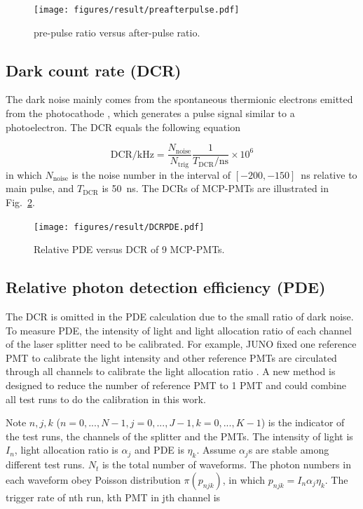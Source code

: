 \begin{figure}[!htbp]
    \centering
    \texttt{[image: figures/result/preafterpulse.pdf]}
    \caption{pre-pulse ratio versus after-pulse ratio.}
    \label{fig:prepulseCompare}
\end{figure}

\subsection{Dark count rate (DCR)}
\label{sec:dcr}
The dark noise mainly comes from the spontaneous thermionic electrons emitted from the photocathode \cite{KM3NetTesting}, which generates a pulse signal similar to a photoelectron. The DCR equals the following equation

\begin{equation}
    \mathrm{DCR/kHz} = \frac{N_{\mathrm{noise}}}{N_{\mathrm{trig}}}\frac{1}{T_{\mathrm{DCR}}/\mathrm{ns}}\times 10^{6}
\end{equation}
in which $N_{\mathrm{noise}}$ is the noise number in the interval of $[-200,-150]$\ ns relative to main pulse, and $T_{\mathrm{DCR}}$ is \SI{50}{ns}. The DCRs of MCP-PMTs are illustrated in Fig.~\ref{fig:DCRCompare}.

\begin{figure}[!htbp]
    \centering
    \texttt{[image: figures/result/DCRPDE.pdf]}
    \caption{Relative PDE versus DCR of 9 MCP-PMTs.}
    \label{fig:DCRCompare}
\end{figure}

\subsection{Relative photon detection efficiency (PDE)}
The DCR is omitted in the PDE calculation due to the small ratio of dark noise. To measure PDE, the intensity of light and light allocation ratio of each channel of the laser splitter need to be calibrated. For example, JUNO fixed one reference PMT to calibrate the light intensity and other reference PMTs are circulated through all channels to calibrate the light allocation ratio \cite{Wonsak_2021}. A new method is designed to reduce the number of reference PMT to 1 PMT and could combine all test runs to do the calibration in this work.

Note $n,j,k$ ($n=0,...,N-1, j=0,...,J-1, k=0,...,K-1$) is the indicator of the test runs, the channels of the splitter and the PMTs. The intensity of light is $I_n$, light allocation ratio is $\alpha_j$ and PDE is $\eta_k$. Assume $\alpha_j$s are stable among different test runs. $N_t$ is the total number of waveforms. The photon numbers in each waveform obey Poisson distribution $\pi(p_{njk})$, in which $p_{njk}=I_n\alpha_j\eta_k$. The trigger rate of nth run, kth PMT in jth channel is

